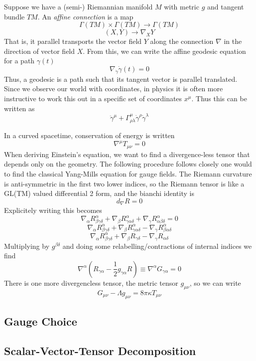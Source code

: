 Suppose we have a (semi-) Riemannian manifold $M$ with metric $g$ and tangent bundle $TM$. An \textit{affine connection} is a map
\[ \Gamma (TM) \times \Gamma (TM) \rightarrow \Gamma (TM) \]
\[ (X,Y) \rightarrow \nabla_X Y \]
That is, it parallel transports the vector field $Y$ along the connection $\nabla$ in the direction of vector field $X$. From this, we can write the affine geodesic equation for a path $\gamma(t)$
\[ \nabla_{\dot\gamma} \dot\gamma(t) = 0 \]
Thus, a geodesic is a path such that its tangent vector is parallel translated. Since we observe our world with coordinates, in physics it is often more instructive to work this out in a specific set of coordinates $x^\mu$. Thus this can be written as
\[ \ddot{\gamma}^\mu + \Gamma^{\mu}_{\rho\lambda}\dot{\gamma}^\rho \dot{\gamma}^\lambda  \]

In a curved spacetime, conservation of energy is written
\[ \nabla^\mu T_{\mu\nu} = 0\]
When deriving Einstein's equation, we want to find a divergence-less tensor that depends only on the geometry. The following procedure follows closely one would to find the classical Yang-Mills equation for gauge fields. The Riemann curvature is anti-symmetric in the first two lower indices, so the Riemann tensor is like a GL(TM) valued differential 2 form, and the bianchi identity is
\[ d_{\nabla} R = 0 \]
Explicitely writing this becomes
\[ \nabla_{\alpha} R^{\alpha}_{\beta\gamma\delta} + \nabla_{\beta}R^{\alpha}_{\gamma\alpha\delta} + \nabla_{\gamma}R^{\alpha}_{\alpha\beta\delta} = 0 \]
\[ \nabla_{\alpha} R^{\alpha}_{\beta\gamma\delta} + \nabla_{\beta}R^{\alpha}_{\gamma\alpha\delta} - \nabla_{\gamma}R^{\alpha}_{\beta\alpha\delta} \]
\[ \nabla_{\alpha}R^{\alpha}_{\beta\gamma\delta} + \nabla_{\beta}R_{\gamma\delta} - \nabla_{\gamma}R_{\alpha\delta} \]
Multiplying by $g^{\beta\delta}$ and doing some relabelling/contractions of internal indices we find
\[ \nabla^\alpha(R_{\gamma\alpha}-\frac{1}{2}g_{\gamma\alpha}R) \equiv \nabla^{\alpha}G_{\gamma\alpha} = 0 \]
There is one more divergencless tensor, the metric tensor $g_{\mu\nu}$, so we can write
\[ G_{\mu\nu} - \Lambda g_{\mu\nu} = 8\pi\kappa T_{\mu\nu} \]

\subsection{Gauge Choice}
\subsection{Scalar-Vector-Tensor Decomposition}

